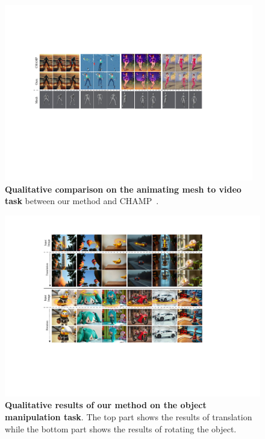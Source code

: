 \begin{figure}
    \centering
    \includegraphics[width=0.97\textwidth]{pictures/m2v2.pdf}
    \caption{\textbf{Qualitative comparison on the animating mesh to video task} between our method and CHAMP~\cite{zhu2024champ}.}
    \label{fig:m2v2}
\end{figure}



\begin{figure}
    \centering
    \includegraphics[width=\textwidth]{pictures/mani.pdf}
    \caption{\textbf{Qualitative results of our method on the object manipulation task}. The top part shows the results of translation while the bottom part shows the results of rotating the object.}
    \label{fig:mani2d}
\end{figure}

